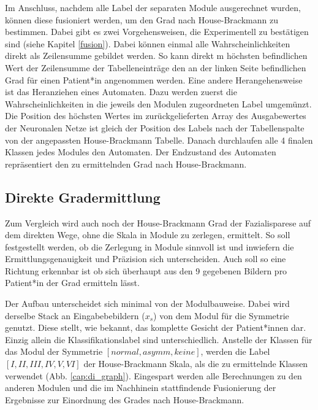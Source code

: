 Im Anschluss, nachdem alle Label der separaten Module ausgerechnet wurden, können diese fusioniert werden, um den Grad nach House-Brackmann zu bestimmen. Dabei gibt es zwei Vorgehensweisen, die Experimentell zu bestätigen sind (siehe Kapitel \ref{fusion}). Dabei können einmal alle Wahrscheinlichkeiten direkt als Zeilensumme gebildet werden. So kann direkt m höchsten befindlichen Wert der Zeilensumme der Tabelleneinträge den an der linken Seite befindlichen Grad für einen Patient*in angenommen werden. Eine andere Herangehensweise ist das Heranziehen eines Automaten. Dazu werden zuerst die Wahrscheinlichkeiten in die jeweils den Modulen zugeordneten Label umgemünzt. Die Position des höchsten Wertes im zurückgelieferten Array des Ausgabewertes der Neuronalen Netze ist gleich der Position des Labels nach der Tabellenspalte von der angepassten House-Brackmann Tabelle. Danach durchlaufen alle 4 finalen Klassen jedes Modules den Automaten. Der Endzustand des Automaten repräsentiert den zu ermittelnden Grad nach House-Brackmann.


\subsection{Direkte Gradermittlung}\label{di_module}
 Zum Vergleich wird auch noch der House-Brackmann Grad der Fazialisparese auf dem direkten Wege, ohne die Skala in Module zu zerlegen, ermittelt. So soll festgestellt werden, ob die Zerlegung in Module sinnvoll ist und inwiefern die Ermittlungsgenauigkeit und Präzision sich unterscheiden. Auch soll so eine Richtung erkennbar ist ob sich überhaupt aus den 9 gegebenen Bildern pro Patient*in der Grad ermitteln lässt.

\vspace{1cm}

 Der Aufbau unterscheidet sich minimal von der Modulbauweise. Dabei wird derselbe Stack an Eingabebebildern ($x_s$) von dem Modul für die Symmetrie genutzt. Diese stellt, wie bekannt, das komplette Gesicht der Patient*innen dar. Einzig allein die Klassifikationslabel sind unterschiedlich. Anstelle der Klassen für das Modul der Symmetrie $[normal, asymm, keine]$, werden die Label $[I, II, III, IV, V, VI]$ der House-Brackmann Skala, als die zu ermittelnde Klassen verwendet (Abb. \ref{cap:di_graph}). Eingespart werden alle Berechnungen zu den anderen Modulen und die im Nachhinein stattfindende Fusionierung der Ergebnisse zur Einordnung des Grades nach House-Brackmann.


